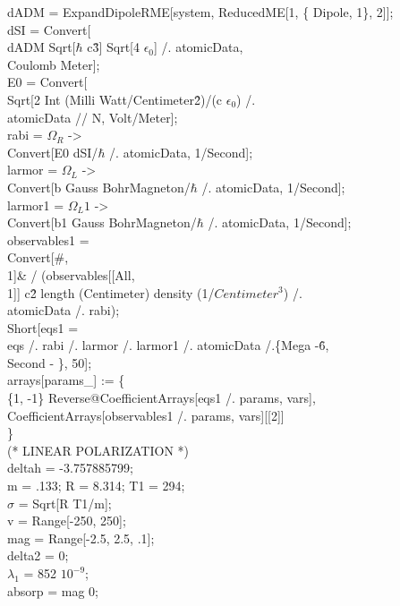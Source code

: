 dADM = ExpandDipoleRME[system, ReducedME[1, \{ Dipole, 1\}, 2]];\\
dSI = Convert[\\
   dADM Sqrt[$\hbar$ c\^ 3] Sqrt[4 $\epsilon_0$] /. atomicData, \\
   Coulomb Meter];\\
E0 = Convert[\\
   Sqrt[2 Int (Milli Watt/Centimeter\^ 2)/(c $\epsilon_0$) /. \\
     atomicData // N, Volt/Meter];\\
rabi = $\Omega_R$ -\textgreater \\
   Convert[E0 dSI/$\hbar$ /. atomicData, 1/Second]; \\
larmor = $\Omega_L$ -\textgreater \\
   Convert[b Gauss BohrMagneton/$\hbar$ /. atomicData, 1/Second];\\
larmor1 = $\Omega_L1$ -\textgreater \\
   Convert[b1 Gauss BohrMagneton/$\hbar$ /. atomicData, 1/Second];\\
observables1 = \\
  Convert[\#, \\
     1]\& / \@ (observables[[All, \\
        1]] c\^ 2 length (Centimeter) density (1/$Centimeter^3$) /. \\
      atomicData /. rabi); \\
Short[eqs1 = \\
   eqs /. rabi /. larmor /. larmor1 /. atomicData /.\{Mega -\^ 6, \\
     Second - \}, 50]; \\
arrays[params\_] := \{ \\
  \{1, -1\} Reverse@CoefficientArrays[eqs1 /. params, vars], \\
  CoefficientArrays[observables1 /. params, vars][[2]] \\
  \}\\
(*  LINEAR POLARIZATION *)\\
deltah = -3.757885799;\\
m = .133; R = 8.314; T1 = 294;\\
$\sigma$ = Sqrt[R T1/m];\\
v = Range[-250, 250];\\
mag = Range[-2.5, 2.5, .1];\\
delta2 = 0;\\
$\lambda_1$ = 852  $10^{-9}$;\\
absorp = mag 0;\\
